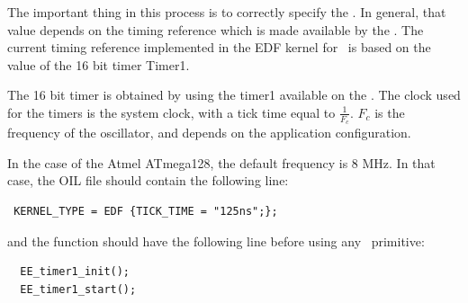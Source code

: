 The important thing in this process is to correctly specify the
. In general, that value depends on the timing
reference which is made available by the \avr. The current timing
reference implemented in the EDF kernel for \avr\ is based on the
value of the 16 bit timer Timer1.

The 16 bit timer is obtained by using the timer1 available on the
\avr.  The clock used for the timers is the system clock, with a tick
time equal to $\frac{1}{F_{c}}$. $F_c$ is the frequency of the
oscillator, and depends on the application configuration.

In the case of the Atmel ATmega128, the default frequency is 8 MHz. In
that case, the OIL file should contain the following line:
\begin{lstlisting}
 KERNEL_TYPE = EDF {TICK_TIME = "125ns";};
\end{lstlisting}
and the  function should have the following line before
using any \ee\ primitive:
\begin{lstlisting}
  EE_timer1_init();
  EE_timer1_start();
\end{lstlisting}




